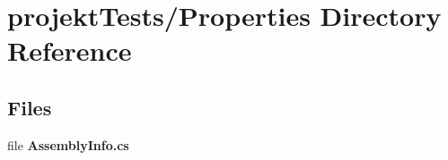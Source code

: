 \section{projekt\+Tests/\+Properties Directory Reference}
\label{dir_a6eac446164dd649bf86b498221823db}
\subsection*{Files}
\begin{DoxyCompactItemize}
\item 
file \textbf{ Assembly\+Info.\+cs}
\end{DoxyCompactItemize}
